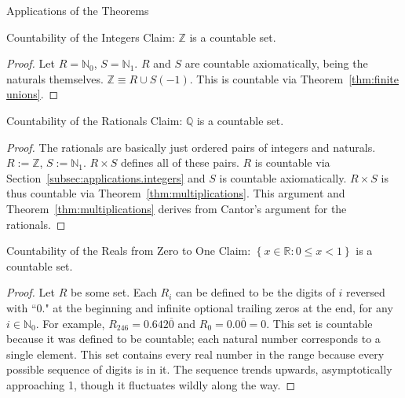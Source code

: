 \documentclass[12pt]{article}
\begin{document}
\pagebreak\begin{section}{Applications of the Theorems}\label{sec:applications}
	\begin{subsection}{Countability of the Integers}\label{subsec:applications.integers}
		Claim: $\mathbb Z$ is a countable set.
		\begin{proof}
			Let $R=\mathbb N_0$, $S=\mathbb N_1$. $R$ and $S$ are countable axiomatically,
			being the naturals themselves. $\mathbb Z\equiv R\cup S(-1)$. This is countable
			via Theorem~\ref{thm:finite unions}.
		\end{proof}
	\end{subsection}

	\vspace{-1em}\begin{subsection}{Countability of the Rationals}\label{subsec:applications.rationals}
		Claim: $\mathbb Q$ is a countable set.
		\begin{proof}
			The rationals are basically just ordered pairs of integers and naturals.
			$R:=\mathbb Z$, $S:=\mathbb N_1$. $R\times S$ defines all of these pairs.
			$R$ is countable via Section~\ref{subsec:applications.integers} and $S$ is
			countable axiomatically. $R\times S$ is thus countable via Theorem~\ref{thm:multiplications}.
			This argument and Theorem~\ref{thm:multiplications} derives from Cantor's argument for the rationals.
		\end{proof}
	\end{subsection}

	\vspace{-1em}\begin{subsection}{Countability of the Reals from Zero to One}\label{subsec:applications.reals 0 to 1}
		Claim: $\left\{x\in\mathbb R:0\le x<1\right\}$ is a countable set.
		\begin{proof}
			Let $R$ be some set. Each $R_i$ can be defined to be the digits of $i$ reversed
			with ``0." at the beginning and infinite optional trailing zeros at the end, for
			any $i\in\mathbb N_0$. For example, $R_{246}=0.642\overline0$ and
			$R_0=0.0\overline0=0$. This set is countable because it was defined to be countable;
			each natural number corresponds to a single element. This set contains every real
			number in the range because every possible sequence of digits is in it. The sequence
			trends upwards, asymptotically approaching 1, though it fluctuates wildly along the way.
		\end{proof}
	\end{subsection}


\end{section}
\end{document}
